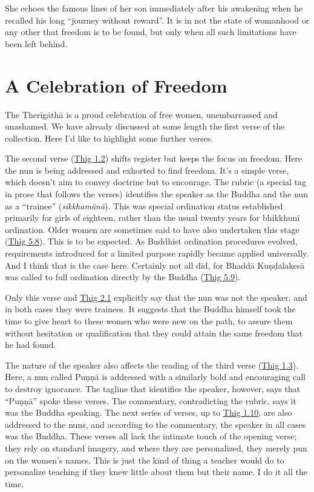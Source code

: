 \documentclass[12pt,openany]{book}%
\begin{document}
She echoes the famous lines of her son immediately after his awakening when he recalled his long “journey without reward”. It is in not the state of womanhood or any other that freedom is to be found, but only when all such limitations have been left behind.

\section*{A Celebration of Freedom}

The \textsanskrit{Therīgāthā} is a proud celebration of free women, unembarrassed and unashamed. We have already discussed at some length the first verse of the collection. Here I’d like to highlight some further verses.

The second verse (\href{https://suttacentral.net/thig1.2}{Thig 1.2}) shifts register but keeps the focus on freedom. Here the nun is being addressed and exhorted to find freedom. It’s a simple verse, which doesn’t aim to convey doctrine but to encourage. The rubric (a special tag in prose that follows the verses) identifies the speaker as the Buddha and the nun as a “trainee” (\textit{\textsanskrit{sikkhamānā}}). This was special ordination status established primarily for girls of eighteen, rather than the usual twenty years for \textsanskrit{bhikkhunī} ordination. Older women are sometimes said to have also undertaken this stage (\href{https://suttacentral.net/thig5.8}{Thig 5.8}). This is to be expected. As Buddhist ordination procedures evolved, requirements introduced for a limited purpose rapidly became applied universally. And I think that is the case here. Certainly not all did, for \textsanskrit{Bhaddā} \textsanskrit{Kuṇḍalakesā} was called to full ordination directly by the Buddha (\href{https://suttacentral.net/thig5.9}{Thig 5.9}).

Only this verse and \href{https://suttacentral.net/thig2.1}{Thig 2.1} explicitly say that the nun was not the speaker, and in both cases they were trainees. It suggests that the Buddha himself took the time to give heart to these women who were new on the path, to assure them without hesitation or qualification that they could attain the same freedom that he had found.

The nature of the speaker also affects the reading of the third verse (\href{https://suttacentral.net/thig1.3}{Thig 1.3}). Here, a nun called \textsanskrit{Puṇṇā} is addressed with a similarly bold and encouraging call to destroy ignorance. The tagline that identifies the speaker, however, says that “\textsanskrit{Puṇṇā}” spoke these verses. The commentary, contradicting the rubric, says it was the Buddha speaking. The next series of verses, up to \href{https://suttacentral.net/thig1.10}{Thig 1.10}, are also addressed to the nuns, and according to the commentary, the speaker in all cases was the Buddha. These verses all lack the intimate touch of the opening verse; they rely on standard imagery, and where they are personalized, they merely pun on the women’s names. This is just the kind of thing a teacher would do to personalize teaching if they knew little about them but their name. I do it all the time.
\end{document}
